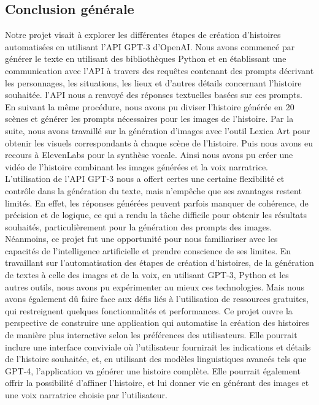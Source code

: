 \documentclass[11,5pt]{report}
\begin{document}
\begin{spacing}{2}
\begin{spacing}{2}
\appendix
\chapter*{Conclusion générale}

\begin{onehalfspace}
Notre projet visait à explorer les différentes étapes de création d’histoires automatisées en utilisant l’API GPT-3 d’OpenAI\cite{OpenAIDocs}. Nous avons commencé par générer le texte en utilisant des bibliothèques Python et en établissant une communication avec l’API à travers des requêtes contenant des prompts décrivant les personnages, les situations, les lieux et d’autres détails concernant l’histoire souhaitée. l’API nous a renvoyé des réponses textuelles basées sur ces prompts. En suivant la même procédure, nous avons pu diviser l’histoire générée en 20 scènes et générer les prompts nécessaires pour les images de l’histoire. Par la suite, nous avons travaillé sur la génération d’images avec l’outil Lexica Art\cite{Lexica} pour obtenir les visuels correspondants à chaque scène de l’histoire. Puis nous avons eu recours à ElevenLabs\cite{ElevenLabs} pour la synthèse vocale. Ainsi nous avons pu créer une vidéo de l’histoire combinant les images générées et la voix narratrice.
\newline
L’utilisation de l’API GPT-3\cite{OpenAIDocs} nous a offert certes une certaine flexibilité et contrôle dans la génération du texte, mais n’empêche que ses avantages restent limités. En effet, les réponses générées peuvent parfois manquer de cohérence, de précision et de logique, ce qui a rendu la tâche difficile pour obtenir les résultats souhaités, particulièrement pour la génération des prompts des images.
\newline
Néanmoins, ce projet fut une opportunité pour nous familiariser avec les capacités de l’intelligence artificielle et prendre conscience de ses limites. En travaillant sur l’automatisation des étapes de création d'histoires, de la génération de textes à celle des images et de la voix, en utilisant GPT-3, Python et les autres outils, nous avons pu expérimenter au mieux ces technologies. Mais nous avons également dû faire face aux défis liés à l'utilisation de ressources gratuites, qui restreignent quelques fonctionnalités et performances.
\newline
Ce projet ouvre la perspective de construire une application qui automatise la création des histoires de manière plus interactive selon les préférences des utilisateurs. Elle pourrait inclure une interface conviviale où l’utilisateur fournirait les indications et détails de l’histoire souhaitée, et, en utilisant des modèles linguistiques avancés tels que GPT-4, l’application va générer une histoire complète. Elle pourrait également offrir la possibilité d’affiner l’histoire, et lui donner vie en générant des images et une voix narratrice choisie par l’utilisateur.

\end{onehalfspace}
\end{spacing}
\end{spacing}
\end{document}
